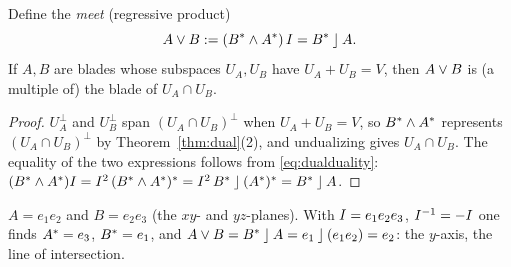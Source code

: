 \begin{corollary}\label{cor:meet}
Define the \emph{meet} (regressive product)
\[
 A\vee B:=(B^{\ast}\wedge A^{\ast})\,I=B^{\ast}\mathbin{\rfloor} A .
\]
If $A,B$ are blades whose subspaces $U_A,U_B$ have $U_A+U_B=V$, then $A\vee B$ is (a multiple of) the blade of $U_A\cap U_B$.
\end{corollary}
\begin{proof}
$U_A^\perp$ and $U_B^\perp$ span $(U_A\cap U_B)^\perp$ when $U_A+U_B=V$, so $B^{\ast}\wedge A^{\ast}$ represents $(U_A\cap U_B)^\perp$ by Theorem~\ref{thm:dual}(2), and undualizing gives $U_A\cap U_B$. The equality of the two expressions follows from \eqref{eq:dualduality}: $(B^{\ast}\wedge A^{\ast})I=I^2\,(B^{\ast}\wedge A^{\ast})^{\ast}=I^2\,B^{\ast}\mathbin{\rfloor}(A^{\ast})^{\ast}=B^{\ast}\mathbin{\rfloor} A$.
\end{proof}

\begin{example}
$A=e_1e_2$ and $B=e_2e_3$ (the $xy$- and $yz$-planes). With $I=e_1e_2e_3$, $I^{-1}=-I$ one finds $A^{\ast}=e_3$, $B^{\ast}=e_1$, and $A\vee B=B^{\ast}\mathbin{\rfloor} A=e_1\mathbin{\rfloor}(e_1e_2)=e_2$: the $y$-axis, the line of intersection.
\end{example}
